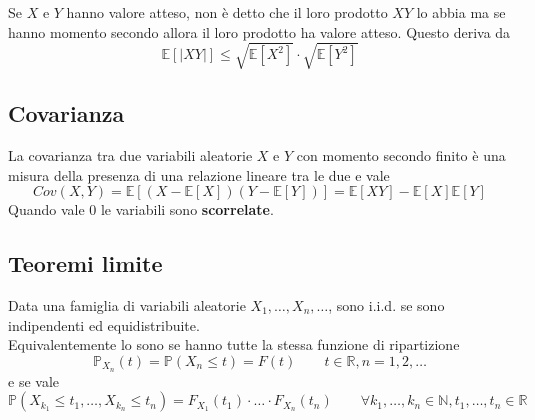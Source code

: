 \begin{proposition}
	Se $X$ e $Y$ hanno valore atteso, non è detto che il loro prodotto $XY$ lo abbia ma se hanno momento secondo allora il loro prodotto ha valore atteso. Questo deriva da
	\begin{equation}
		\mathbb{E}[\lvert XY \rvert] \leq \sqrt{\mathbb{E}[X^2]} \cdot \sqrt{\mathbb{E}[Y^2]}
	\end{equation}
\end{proposition}

\subsection{Covarianza}
\begin{definition}[Covarianza]
	La covarianza tra due variabili aleatorie $X$ e $Y$ con momento secondo finito è una misura della presenza di una relazione lineare tra le due e vale
	\begin{equation}
		Cov(X,Y) = \mathbb{E}[(X - \mathbb{E}[X])(Y-\mathbb{E}[Y])] = \mathbb{E}[XY] - \mathbb{E}[X]\mathbb{E}[Y]
	\end{equation}
	Quando vale $0$ le variabili sono \textbf{scorrelate}.
\end{definition}

\subsection{Teoremi limite}
\begin{definition}
	Data una famiglia di variabili aleatorie $X_1, \ldots, X_n, \ldots$, sono i.i.d. se sono indipendenti ed equidistribuite.\\
	Equivalentemente lo sono se hanno tutte la stessa funzione di ripartizione
	\begin{equation}
		\mathbb{P}_{X_n}(t) = \mathbb{P}(X_n \leq t) = F(t) \quad\quad t \in \mathbb{R}, n=1,2,\ldots
	\end{equation}
	e se vale
	\begin{equation}
		\mathbb{P}(X_{k_1} \leq t_1, \ldots, X_{k_n} \leq t_n) = F_{X_1}(t_1) \cdot \ldots \cdot F_{X_n}(t_n) \quad\quad \forall k_1, \ldots, k_n \in \mathbb{N}, t_1, \ldots, t_n \in \mathbb{R}
	\end{equation}
\end{definition}